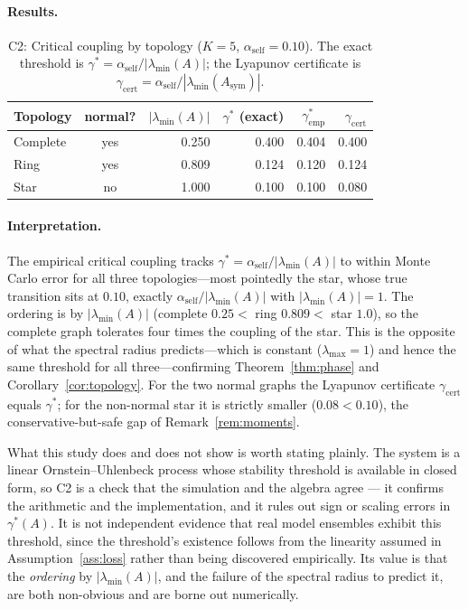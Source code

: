 \documentclass[12pt]{article}
\theoremstyle{plain}
\theoremstyle{definition}
\newcommand{\abs}[1]{\left| #1 \right|}
\begin{document}
\paragraph{Results.}

\begin{table}[H]
\centering
\caption{C2: Critical coupling by topology
($K=5$, $\alpha_{\mathrm{self}}=0.10$).  The exact threshold is
$\gamma^*=\alpha_{\mathrm{self}}/\abs{\lambda_{\min}(A)}$; the Lyapunov
certificate is $\gamma_{\mathrm{cert}}=\alpha_{\mathrm{self}}/\abs{\lambda_{\min}(A_{\mathrm{sym}})}$.}
\label{tab:c2}
\begin{tabular}{lcrrrr}
\toprule
Topology & normal? & $\abs{\lambda_{\min}(A)}$ & $\gamma^*$ (exact)
  & $\gamma^*_{\mathrm{emp}}$ & $\gamma_{\mathrm{cert}}$ \\
\midrule
Complete & yes & 0.250 & 0.400 & 0.404 & 0.400 \\
Ring     & yes & 0.809 & 0.124 & 0.120 & 0.124 \\
Star     & no  & 1.000 & 0.100 & 0.100 & 0.080 \\
\bottomrule
\end{tabular}
\end{table}

\paragraph{Interpretation.}
The empirical critical coupling tracks
$\gamma^*=\alpha_{\mathrm{self}}/\abs{\lambda_{\min}(A)}$ to within Monte
Carlo error for all three topologies---most pointedly the star, whose true
transition sits at $0.10$, exactly $\alpha_{\mathrm{self}}/\abs{\lambda_{\min}(A)}$
with $\abs{\lambda_{\min}(A)}=1$.  The ordering is by $\abs{\lambda_{\min}(A)}$
(complete $0.25 <$ ring $0.809 <$ star $1.0$), so the complete graph
tolerates four times the coupling of the star.  This is the opposite of
what the spectral radius predicts---which is constant ($\lambda_{\max}=1$)
and hence the same threshold for all three---confirming
Theorem~\ref{thm:phase} and Corollary~\ref{cor:topology}.  For the two
normal graphs the Lyapunov certificate $\gamma_{\mathrm{cert}}$ equals
$\gamma^*$; for the non-normal star it is strictly smaller ($0.08<0.10$),
the conservative-but-safe gap of Remark~\ref{rem:moments}.

What this study does and does not show is worth stating plainly. The system is a linear
Ornstein--Uhlenbeck process whose stability threshold is available in closed form, so C2 is a check
that the simulation and the algebra agree --- it confirms the arithmetic and the implementation, and
it rules out sign or scaling errors in $\gamma^*(A)$. It is not independent evidence that real model
ensembles exhibit this threshold, since the threshold's existence follows from the linearity assumed
in Assumption~\ref{ass:loss} rather than being discovered empirically. Its value is that the
\emph{ordering} by $\abs{\lambda_{\min}(A)}$, and the failure of the spectral radius to predict it,
are both non-obvious and are borne out numerically.
\end{document}
